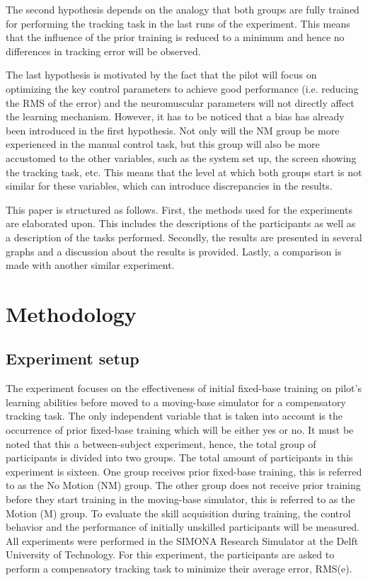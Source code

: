 \documentclass[conference]{IEEEtran}
\begin{document}
The second hypothesis depends on the analogy that both groups are fully trained for performing the tracking task in the last runs of the experiment. This means that the influence of the prior training is reduced to a minimum and hence no differences in tracking error will be observed.

The last hypothesis is motivated by the fact that the pilot will focus on optimizing the key control parameters to achieve good performance (i.e. reducing the RMS of the error) and the neuromuscular parameters will not directly affect the learning mechanism. However, it has to be noticed that a bias has already been introduced in the first hypothesis. Not only will the NM group be more experienced in the manual control task, but this group will also be more accustomed to the other variables, such as the system set up, the screen showing the tracking task, etc. This means that the level at which both groups start is not similar for these variables, which can introduce discrepancies in the results. 

This paper is structured as follows. First, the methods used for the experiments are elaborated upon. This includes the descriptions of the participants as well as a description of the tasks performed. Secondly, the results are presented in several graphs and a discussion about the results is provided. Lastly, a comparison is made with another similar experiment. \\


\section{Methodology}
\subsection{Experiment setup}
The experiment focuses on the effectiveness of initial fixed-base training on pilot's learning abilities before moved to a moving-base simulator for a compensatory tracking task. The only independent variable that is taken into account is the occurrence of prior fixed-base training which will be either yes or no. It must be noted that this a between-subject experiment, hence, the total group of participants is divided into two groups. The total amount of participants in this experiment is sixteen.  One group receives prior fixed-base training, this is referred to as the No Motion (NM) group. The other group does not receive prior training before they start training in the moving-base simulator, this is referred to as the Motion (M) group.  To evaluate the skill acquisition during training, the control behavior and the performance of initially unskilled participants will be measured. All experiments were performed in the SIMONA Research Simulator at the Delft University of Technology. For this experiment, the participants are asked to perform a compensatory tracking task to minimize their average error, RMS(e).\\
\end{document}

